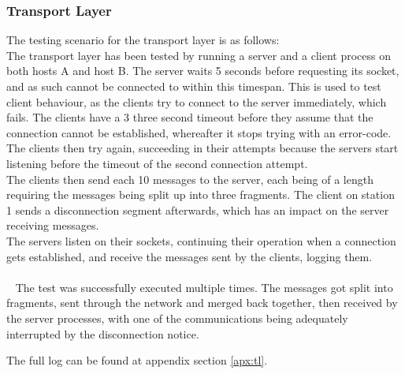 \subsubsection{Transport Layer}
The testing scenario for the transport layer is as follows:\\
The transport layer has been tested by running a server and a client process on both hosts A and host B. The server waits 5 seconds before requesting its socket, and as such cannot be connected to within this timespan. This is used to test client behaviour, as the clients try to connect to the server immediately, which fails. The clients have a 3 three second timeout before they assume that the connection cannot be established, whereafter it stops trying with an error-code. The clients then try again, succeeding in their attempts because the servers start listening before the timeout of the second connection attempt.\\
The clients then send each 10 messages to the server, each being of a length requiring the messages being split up into three fragments. The client on station 1 sends a disconnection segment afterwards, which has an impact on the server receiving messages.\\
The servers listen on their sockets, continuing their operation when a connection gets established, and receive the messages sent by the clients, logging them.\\
\\~
The test was successfully executed multiple times. The messages got split into fragments, sent through the network and merged back together, then received by the server processes, with one of the communications being adequately interrupted by the disconnection notice.

The full log can be found at appendix section \ref{apx:tl}.
